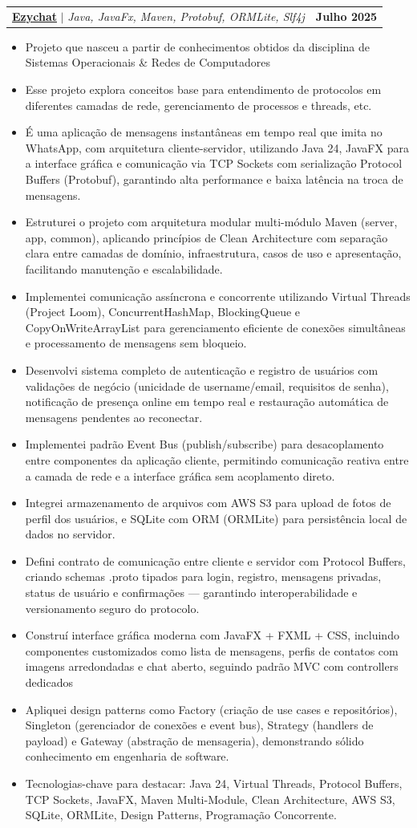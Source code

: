 \documentclass[letterpaper,11pt]{article}
\makeatletter
\newcommand{\resumeItem}[1]{
  \item\small{
    {#1 \vspace{-2pt}}
  }
}
\newcommand{\resumeProjectHeading}[2]{
    \item
    \begin{tabular*}{1.001\textwidth}{l@{\extracolsep{\fill}}r}
      \small#1 & \textbf{\small #2}\\
    \end{tabular*}\vspace{-7pt}
}
\newcommand{\resumeItemListStart}{\begin{itemize}}
\newcommand{\resumeItemListEnd}{\end{itemize}\vspace{-5pt}}
\makeatother
\begin{document}
      \resumeProjectHeading
          {\textbf{\href{https://github.com/elvitin/ezychat}{\underline{Ezychat}}} $|$ \emph{Java, JavaFx, Maven, Protobuf, ORMLite, Slf4j}}{Julho 2025}
          \resumeItemListStart
            \resumeItem{Projeto que nasceu a partir de conhecimentos obtidos da disciplina de Sistemas Operacionais \& Redes de Computadores}
            \resumeItem{Esse projeto explora conceitos base para entendimento de protocolos em diferentes camadas de rede, gerenciamento de processos e threads, etc.}
            \resumeItem{É uma aplicação de mensagens instantâneas em tempo real que imita no WhatsApp, com arquitetura cliente-servidor, utilizando Java 24, JavaFX para a interface gráfica e comunicação via TCP Sockets com serialização Protocol Buffers (Protobuf), garantindo alta performance e baixa latência na troca de mensagens.}
            \resumeItem{Estruturei o projeto com arquitetura modular multi-módulo Maven (server, app, common), aplicando princípios de Clean Architecture com separação clara entre camadas de domínio, infraestrutura, casos de uso e apresentação, facilitando manutenção e escalabilidade.}
            \resumeItem{Implementei comunicação assíncrona e concorrente utilizando Virtual Threads (Project Loom), ConcurrentHashMap, BlockingQueue e CopyOnWriteArrayList para gerenciamento eficiente de conexões simultâneas e processamento de mensagens sem bloqueio.}
            \resumeItem{Desenvolvi sistema completo de autenticação e registro de usuários com validações de negócio (unicidade de username/email, requisitos de senha), notificação de presença online em tempo real e restauração automática de mensagens pendentes ao reconectar.}
            \resumeItem{Implementei padrão Event Bus (publish/subscribe) para desacoplamento entre componentes da aplicação cliente, permitindo comunicação reativa entre a camada de rede e a interface gráfica sem acoplamento direto.}
            \resumeItem{Integrei armazenamento de arquivos com AWS S3 para upload de fotos de perfil dos usuários, e SQLite com ORM (ORMLite) para persistência local de dados no servidor.}
            \resumeItem{Defini contrato de comunicação entre cliente e servidor com Protocol Buffers, criando schemas .proto tipados para login, registro, mensagens privadas, status de usuário e confirmações — garantindo interoperabilidade e versionamento seguro do protocolo.}
            \resumeItem{Construí interface gráfica moderna com JavaFX + FXML + CSS, incluindo componentes customizados como lista de mensagens, perfis de contatos com imagens arredondadas e chat aberto, seguindo padrão MVC com controllers dedicados}
            \resumeItem{Apliquei design patterns como Factory (criação de use cases e repositórios), Singleton (gerenciador de conexões e event bus), Strategy (handlers de payload) e Gateway (abstração de mensageria), demonstrando sólido conhecimento em engenharia de software.}
            \resumeItem{Tecnologias-chave para destacar: Java 24, Virtual Threads, Protocol Buffers, TCP Sockets, JavaFX, Maven Multi-Module, Clean Architecture, AWS S3, SQLite, ORMLite, Design Patterns, Programação Concorrente.}
          \resumeItemListEnd
          \vspace{-13pt}
        
\end{document}
